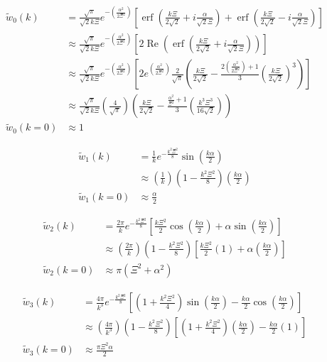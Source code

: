 \documentclass[double,12pt]{beavtex}
\begin{document}
\begin{align}
    \widetilde{w}_0(k) &= \frac{\sqrt{\pi}}{\sqrt{2}k\Xi}e^{-\left(
    \frac{\alpha^2}{2\Xi^2}\right)}\left[\operatorname{erf}
    \left(\frac{k\Xi}{2\sqrt{2}}+i\frac{\alpha}{\sqrt{2}\Xi}\right)
    +\operatorname{erf}\left(\frac{k\Xi}{2\sqrt{2}}-i\frac{\alpha}
    {\sqrt{2}\Xi}\right)\right] \\
    & \approx   \frac{\sqrt{\pi}}{\sqrt{2}k\Xi}e^{-\left(\frac{\alpha^2}
    {2\Xi^2}\right)}\left[2\operatorname{Re}\left(\operatorname{erf}
    \left(\frac{k\Xi}{2\sqrt{2}}+i\frac{\alpha}{\sqrt{2}\Xi}\right)
    \right)\right] \\
    & \approx   \frac{\sqrt{\pi}}{\sqrt{2}k\Xi}e^{-\left(\frac{\alpha^2}
    {2\Xi^2}\right)}\left[2e^{\left(\frac{\alpha^2}{2\Xi^2}\right)}
    \frac{2}{\sqrt{\pi}}\left(\frac{k\Xi}{2\sqrt{2}} -\frac{2\left(
    \frac{\alpha^2}{2\Xi^2}\right)+1}{3}\left(\frac{k\Xi}{2\sqrt{2}}
    \right)^3\right)\right] \\
    & \approx   \frac{\sqrt{\pi}}{\sqrt{2}k\Xi}\left(\frac{4}{\sqrt{\pi}}
    \right)\left(\frac{k\Xi}{2\sqrt{2}} -\frac{\frac{\alpha^2}{\Xi^2}+1}
    {3}\left(\frac{k^3\Xi^3}{16\sqrt{2}}\right)\right) \\
     \widetilde{w}_0(k=0) & \approx 1
\end{align}

\begin{align}
    \widetilde{w}_1(k) &= \frac{1}{k}e^{-\frac{k^2\Xi^2}{8}}
    \sin\left(\frac{k\alpha}{2}\right)  \\
  & \approx\left(\frac{1}{k}\right)\left(1-\frac{k^2\Xi^2}{8}\right)
  \left(\frac{k\alpha}{2}\right)  \\
  \widetilde{w}_1(k=0) & \approx\frac{\alpha}{2}
\end{align}

\begin{align}
     \widetilde{w}_2(k) &= \frac{2\pi}{k}e^{-\frac{k^2\Xi^2}{8}}
       \left[\frac{k\Xi^2}{2}\cos\left(\frac{k\alpha}{2}\right)
       +\alpha\sin\left(\frac{k\alpha}{2}\right)\right] \\
       &  \approx\left(\frac{2\pi}{k}\right)\left(1-\frac{k^2\Xi^2}{8}
       \right)\left[\frac{k\Xi^2}{2}\left(1\right)+\alpha\left(
       \frac{k\alpha}{2}\right)\right] \\
       \widetilde{w}_2(k=0) & \approx \pi(\Xi^2 + \alpha^2)
\end{align}

\begin{align}
  \widetilde{w}_3(k) &= \frac{4\pi}{k^3}e^{-\frac{k^2\Xi^2}{8}}
    \left[\left(1+\frac{k^2\Xi^2}{4}\right)\sin\left(\frac{k\alpha}{2}
    \right)-\frac{k\alpha}{2}\cos\left(\frac{k\alpha}{2}\right)\right]\\
    & \approx \left(\frac{4\pi}{k^3}\right)\left(1-\frac{k^2\Xi^2}{8}
    \right)\left[\left(1+\frac{k^2\Xi^2}{4}\right)\left(\frac{k\alpha}
    {2}\right)-\frac{k\alpha}{2}\left(1\right)\right] \\
     \widetilde{w}_3(k=0) & \approx \frac{\pi\Xi^2\alpha}{2}
\end{align}
\end{document}
